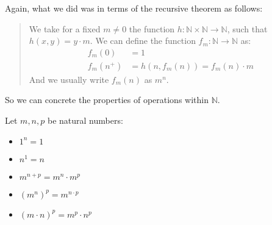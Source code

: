 \documentclass{tufte-handout}
\begin{document}
Again, what we did was in terms of the recursive theorem as follows:
\begin{quote}
	We take for a fixed $m \neq 0$ the function $h: \mathbb{N} \times \mathbb{N} \to \mathbb{N}$, such that $h(x, y) = y \cdot m$. We can define the function $f_m: \mathbb{N} \to \mathbb{N}$ as:
	\begin{align*}
		f_m(0) &= 1\\
		f_m(n^+) &= h(n, f_m(n)) = f_m(n) \cdot m
	\end{align*} 
	And we usually write $f_m(n)$ as $m^n$.
\end{quote}

So we can concrete the properties of operations within $\mathbb{N}$.
\begin{theorem}
	Let $m, n, p$ be natural numbers:
	\begin{itemize}
		\item $1^n = 1$
		\item $n^1 = n$
		\item $m^{n + p} = m^n \cdot m^p$
		\item $(m^n)^p = m^{n \cdot p}$
		\item $(m \cdot n)^p = m^p \cdot n^p$
	\end{itemize}
\end{theorem}
\end{document}
